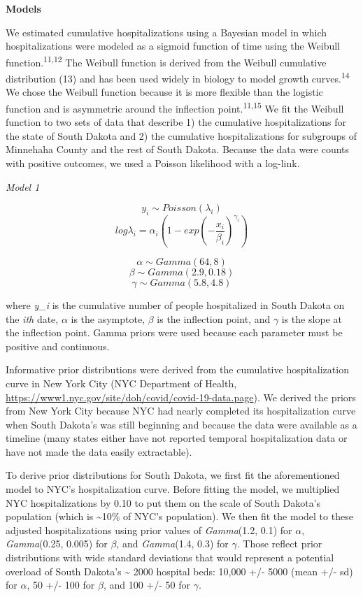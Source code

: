 \documentclass[
]{article}
\begin{document}
\textbf{Models}

We estimated cumulative hospitalizations using a Bayesian model in which hospitalizations were modeled as a sigmoid function of time using the Weibull function.\textsuperscript{11,12} The Weibull function is derived from the Weibull cumulative distribution (13) and has been used widely in biology to model growth curves.\textsuperscript{14} We chose the Weibull function because it is more flexible than the logistic function and is asymmetric around the inflection point.\textsuperscript{11,15} We fit the Weibull function to two sets of data that describe 1) the cumulative hospitalizations for the state of South Dakota and 2) the cumulative hospitalizations for subgroups of Minnehaha County and the rest of South Dakota. Because the data were counts with positive outcomes, we used a Poisson likelihood with a log-link.

\emph{Model 1}

\[y_i \sim Poisson(\lambda_i)\]
\[log\lambda_i = \alpha_i(1 - exp(-\frac{x_i}{\beta_i})^{\gamma_i})\]

\[\alpha \sim Gamma(64,8)\]
\[\beta \sim Gamma(2.9, 0.18)\]
\[\gamma \sim Gamma(5.8,4.8)\]

where \emph{y_i} is the cumulative number of people hospitalized in South Dakota on the \emph{ith} date, \(\alpha\) is the asymptote, \(\beta\) is the inflection point, and \(\gamma\) is the slope at the inflection point. Gamma priors were used because each parameter must be positive and continuous.

Informative prior distributions were derived from the cumulative hospitalization curve in New York City (NYC Department of Health, \url{https://www1.nyc.gov/site/doh/covid/covid-19-data.page}). We derived the priors from New York City because NYC had nearly completed its hospitalization curve when South Dakota's was still beginning and because the data were available as a timeline (many states either have not reported temporal hospitalization data or have not made the data easily extractable).

To derive prior distributions for South Dakota, we first fit the aforementioned model to NYC's hospitalization curve. Before fitting the model, we multiplied NYC hospitalizations by 0.10 to put them on the scale of South Dakota's population (which is \textasciitilde10\% of NYC's population). We then fit the model to these adjusted hospitalizations using prior values of \emph{Gamma}(1.2, 0.1) for \(\alpha\), \emph{Gamma}(0.25, 0.005) for \(\beta\), and \emph{Gamma}(1.4, 0.3) for \(\gamma\). Those reflect prior distributions with wide standard deviations that would represent a potential overload of South Dakota's \textasciitilde{} 2000 hospital beds: 10,000 +/- 5000 (mean +/- sd) for \(\alpha\), 50 +/- 100 for \(\beta\), and 100 +/- 50 for \(\gamma\).
\end{document}
